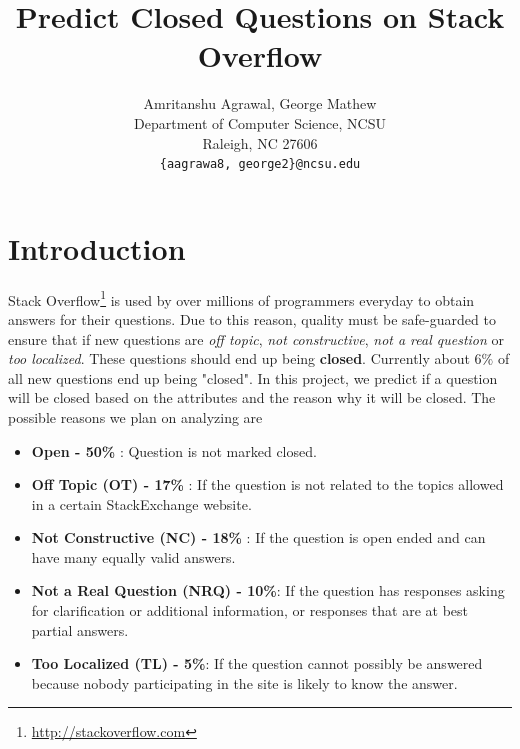 \documentclass{article} %
\title{Predict Closed Questions on Stack Overflow}
\author{
Amritanshu Agrawal, George Mathew\\
Department of Computer Science, NCSU\\
Raleigh, NC 27606 \\
\texttt{\{aagrawa8, george2\}@ncsu.edu} \\
\vspace{-1.0cm}
}
\begin{document}
\maketitle


\section{Introduction}

Stack Overflow\footnote{\url{http://stackoverflow.com}} is used by over millions of programmers everyday to obtain answers for their questions. Due to this reason, quality must be safe-guarded to ensure that if new questions are \textit{off topic}, \textit{not constructive}, \textit{not a real question} or \textit{too localized}. These questions should end up being \textbf{closed}. Currently
about $6\%$ of all new questions end up being "closed". In this project, we predict if a question will be closed based on the attributes and the reason why it will be closed. The possible reasons we plan on analyzing are
\begin{itemize}
    \item \textbf{Open - 50\%} : Question is not marked closed.
    \item \textbf{Off Topic (OT) - 17\%} : If the question is not related to the topics allowed in a certain StackExchange website.
    \item \textbf{Not Constructive (NC) - 18\%} : If the question is open ended and can have many equally valid answers.
    \item \textbf{Not a Real Question (NRQ) - 10\%}: If the question has responses asking for clarification or additional information, or responses that are at best partial answers.
    \item \textbf{Too Localized (TL) - 5\%}: If the question cannot possibly be answered because nobody participating in the site is likely to know the answer.
\end{itemize}
\end{document}
